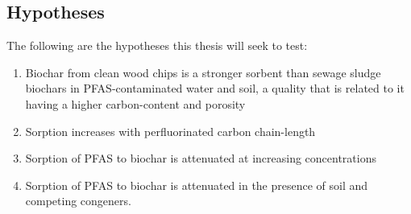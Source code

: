 \subsection{Hypotheses}\label{sec:hypotheis}
The following are the hypotheses this thesis will seek to test:  
\begin{enumerate}[label=\roman*]
    \item Biochar from clean wood chips is a stronger sorbent than sewage sludge biochars in PFAS-contaminated water and soil, a quality that is related to it having a higher carbon-content and porosity
    \item Sorption increases with perfluorinated carbon chain-length
    \item Sorption of PFAS to biochar is attenuated at increasing concentrations
    \item Sorption of PFAS to biochar is attenuated in the presence of soil and competing congeners. 
\end{enumerate}






